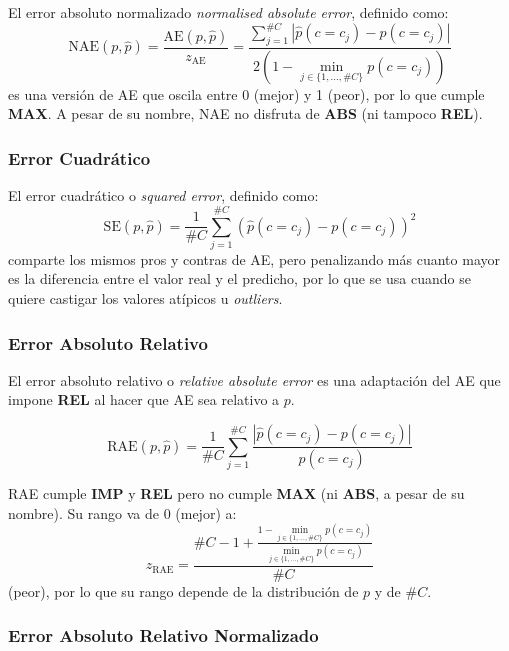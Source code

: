 El error absoluto normalizado {\it normalised absolute error}, definido como:
\begin{equation}
    {\text{NAE}(p, \hat p)} = \frac{\text{AE}(p, \hat p)}{z_{\text{AE}}} = \frac{\sum \limits_{j=1}^{\#C}{|\hat p(c=c_j) - p(c=c_j)|}}{2(1-\displaystyle \min_{j\in\{1,\dots,\#C\}}p(c=c_j))}
\end{equation}
es una versión de AE que oscila entre 0 (mejor) y 1 (peor), por lo que cumple
{\bf MAX}. A pesar de su nombre, NAE no disfruta de {\bf ABS} (ni tampoco {\bf
REL}).

\subsubsection{Error Cuadrático}\label{evaluacion:se}

El error cuadrático o {\it squared error}, definido como:
\begin{equation}
    {\text{SE}(p, \hat p)} = \frac{1}{\#C}\sum \limits_{j=1}^{\#C}{{(\hat p(c=c_j) - p(c=c_j))}^2}
\end{equation}
comparte los mismos pros y contras de AE, pero penalizando más cuanto mayor es
la diferencia entre el valor real y el predicho, por lo que se usa cuando se
quiere castigar los valores atípicos u {\it outliers}.

\subsubsection{Error Absoluto Relativo}\label{evaluacion:rae}

El error absoluto relativo o {\it relative absolute error\/} es una adaptación
del AE que impone {\bf REL} al hacer que AE sea relativo a $p$.

\begin{equation}
    {\text{RAE}(p, \hat p)} = \frac{1}{\#C}\sum \limits_{j=1}^{\#C}{\frac{|\hat p(c=c_j) - p(c=c_j)|}{p(c=c_j)}}
\end{equation}

RAE cumple {\bf IMP} y {\bf REL} pero no cumple {\bf MAX} (ni {\bf ABS}, a pesar
de su nombre). Su rango va de 0 (mejor) a:
\begin{equation}
    z_{\text{RAE}} = \frac{\#C - 1 + \frac {1 - \displaystyle \min_{j\in\{1,\dots,\#C\}}p(c=c_j)}{\displaystyle \min_{j\in\{1,\dots,\#C\}}p(c=c_j)}}{\#C}
\end{equation}
(peor), por lo que su rango depende de la distribución de $p$ y de $\#C$.

\subsubsection{Error Absoluto Relativo Normalizado}\label{evaluacion:nrae}

